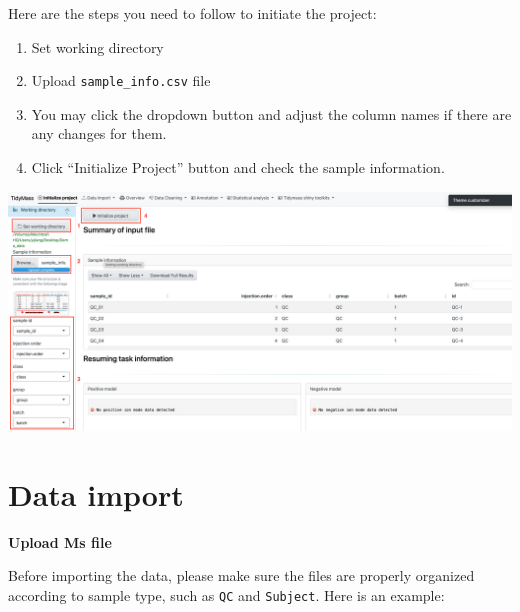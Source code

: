 \documentclass[
]{book}
\providecommand{\tightlist}{%
  \setlength{\itemsep}{0pt}\setlength{\parskip}{0pt}}
\begin{document}
Here are the steps you need to follow to initiate the project:

\begin{enumerate}
\def\labelenumi{\arabic{enumi}.}
\tightlist
\item
  Set working directory
\item
  Upload \texttt{sample\_info.csv} file
\item
  You may click the dropdown button and adjust the column names if there are any changes for them.
\item
  Click ``Initialize Project'' button and check the sample information.
\end{enumerate}

\includegraphics{figures/project_initiate.png}

\section{Data import}\label{data-import}

\textbf{Upload Ms file}

Before importing the data, please make sure the files are properly organized according to sample type, such as \texttt{QC} and \texttt{Subject}. Here is an example:
\end{document}
